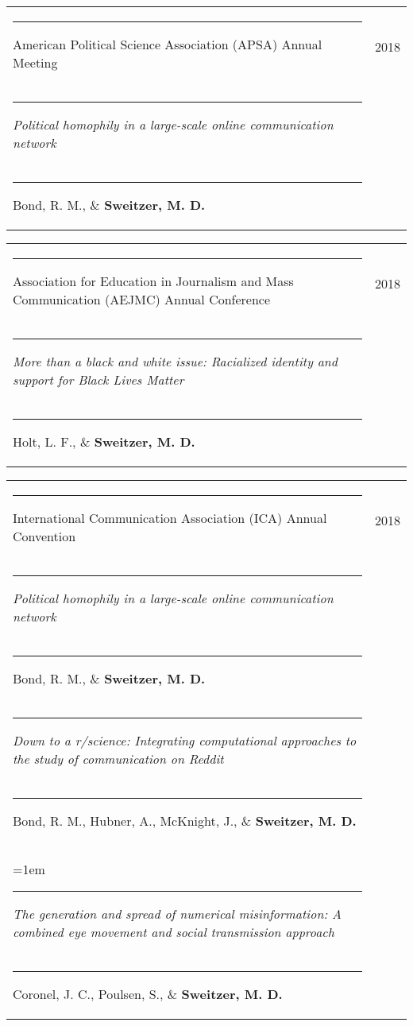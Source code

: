 \documentclass[letterpaper, 10pt]{extarticle}
\begin{document}
\vspace{0.5em}
\begin{tabularx}{\textwidth}{Xr}
\rule{0.5em}{0pt}{\small American Political Science Association (APSA) Annual Meeting} & {\small 2018}\vspace{0.25em}\\
\rule{1em}{0pt}{\raggedright \small \textit{Political homophily in a large-scale online communication network}}\\
\rule{1.25em}{0pt}{\small Bond, R. M., \& \textbf{Sweitzer, M. D.}}
\end{tabularx}

\vspace{0.5em}
\begin{tabularx}{\textwidth}{Xr}
\rule{0.5em}{0pt}{\small Association for Education in Journalism and Mass Communication (AEJMC) Annual Conference} & {\small 2018}\vspace{0.25em}\\
\rule{1em}{0pt}{\raggedright \small \textit{More than a black and white issue: Racialized identity and support for Black Lives Matter}}\\
\rule{1.25em}{0pt}{\small Holt, L. F., \& \textbf{Sweitzer, M. D.}}
\end{tabularx}

\vspace{0.5em}
\begin{tabularx}{\textwidth}{Xr}
\rule{0.5em}{0pt}{\small International Communication Association (ICA) Annual Convention} & {\small 2018}\vspace{0.25em}\\
\rule{1em}{0pt}{\raggedright \small \textit{Political homophily in a large-scale online communication network}}\\
\rule{1.25em}{0pt}{\small Bond, R. M., \& \textbf{Sweitzer, M. D.}}\vspace{0.5em}\\

\rule{1em}{0pt}{\raggedright \small \textit{Down to a r/science: Integrating computational approaches to the study of communication on Reddit}}\\
\rule{1.25em}{0pt}{\small Bond, R. M., Hubner, A., McKnight, J., \& \textbf{Sweitzer, M. D.}}\vspace{0.5em}\\

\hangindent=1em \rule{1em}{0pt}{\raggedright \small \textit{The generation and spread of numerical misinformation: A combined eye movement and social transmission approach}}\\
\rule{1.25em}{0pt}{\small Coronel, J. C., Poulsen, S., \& \textbf{Sweitzer, M. D.}}
\end{tabularx}
\end{document}

